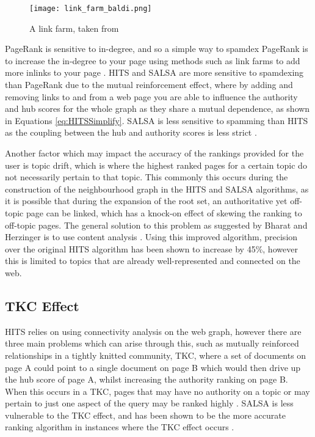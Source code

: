 \documentclass[11pt]{report}
\begin{document}
\begin{figure}[h]
\centering
\texttt{[image: link\_farm\_baldi.png]}
\caption{A link farm, taken from \cite{baldi2003modeling}}
\label{fig:link farm}
\end{figure}

PageRank is sensitive to in-degree, and so a simple way to spamdex PageRank is to increase the in-degree to your page using methods such as link farms to add more inlinks to your page \cite{bonato}. HITS and SALSA are more sensitive to spamdexing than PageRank due to the mutual reinforcement effect, where by adding and removing links to and from a web page you are able to influence the authority and hub scores for the whole graph as they share a mutual dependence, as shown in Equations \eqref{eq:HITSSimplify}. SALSA is less sensitive to spamming than HITS as the coupling between the hub and authority scores is less strict \cite{lempel2000stochastic}.

Another factor which may impact the accuracy of the rankings provided for the user is topic drift, which is where the highest ranked pages for a certain topic do not necessarily pertain to that topic. This commonly this occurs during the construction of the neighbourhood graph in the HITS and SALSA algorithms, as it is possible that during the expansion of the root set, an authoritative yet off-topic page can be linked, which has a knock-on effect of skewing the ranking to off-topic pages. The general solution to this problem as suggested by Bharat and Herzinger is to use content analysis \cite{bharat1998improved}. Using this improved algorithm, precision over the original HITS algorithm has been shown to increase by 45\%, however this is limited to topics that are already well-represented and connected on the web.

\subsection*{TKC Effect}

HITS relies on using connectivity analysis on the web graph, however there are three main problems which can arise through this, such as mutually reinforced relationships in a tightly knitted community, TKC, where a set of documents on page A could point to a single document on page B which would then drive up the hub score of page A, whilst increasing the authority ranking on page B. When this occurs in a TKC, pages that may have no authority on a topic or may pertain to just one aspect of the query may be ranked highly \cite{lempel2000stochastic}. SALSA is less vulnerable to the TKC effect, and has been shown to be the more accurate ranking algorithm in instances where the TKC effect occurs \cite{lempel2000stochastic}.
\end{document}
